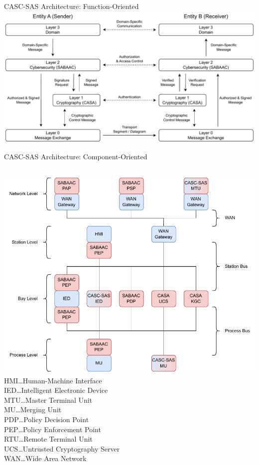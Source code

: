 \documentclass[en]{sdqbeamer}
\begin{document}
\begin{frame}{CASC-SAS Architecture: Function-Oriented}
    \centering
    \includegraphics[height=0.75\textheight]{./figures/layers_request_example.drawio.pdf}
\end{frame}
\begin{frame}{CASC-SAS Architecture: Component-Oriented}
    \begin{columns}
        \centering
        \includegraphics[height=0.75\textheight]{./figures/casc_architecture_color.drawio.pdf}
        \footnotesize
        HMI\dots Human-Machine Interface\\IED\dots Intelligent Electronic Device\\MTU\dots Master Terminal Unit\\MU\dots Merging Unit\\PDP\dots Policy Decision Point\\PEP\dots Policy Enforcement Point\\RTU\dots Remote Terminal Unit\\UCS\dots Untrusted Cryptography Server\\WAN\dots Wide Area Network
    \end{columns}
\end{frame}
\end{document}

